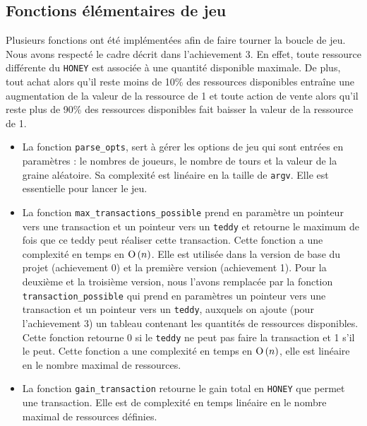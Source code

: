 \documentclass[12pt]{article}
\begin{document}
        \subsection{Fonctions élémentaires de jeu}
        Plusieurs fonctions ont été implémentées afin de faire tourner la boucle de jeu. Nous avons respecté le cadre décrit dans l'achievement 3. En effet, toute ressource différente du \texttt{HONEY} est associée à une quantité disponible maximale. De plus, tout achat alors qu'il reste moins de 10\% des ressources disponibles entraîne une augmentation de la valeur de la ressource de 1 et toute action de vente alors qu'il reste plus de 90\% des ressources disponibles fait baisser la valeur de la ressource de 1. \\
        \begin{itemize}
         \item La fonction \texttt{parse\_opts}, sert à gérer les options de jeu qui sont entrées en paramètres : le nombres de joueurs, le nombre de tours et la valeur de la graine aléatoire. Sa complexité est linéaire en la taille de \texttt{argv}. Elle est essentielle pour lancer le jeu.\\
         
        \item La fonction \texttt{max\_transactions\_possible} prend en paramètre un pointeur vers une transaction et un pointeur vers un \texttt{teddy} et retourne le maximum de fois que ce teddy peut réaliser cette transaction. Cette fonction a une complexité en temps en ${\text{O}}\left(n\right)$. Elle est utilisée dans la version de base du projet (achievement 0) et la première version (achievement 1). Pour la deuxième et la troisième version, nous l'avons remplacée par la fonction \texttt{transaction\_possible} qui prend en paramètres un pointeur vers une transaction et un pointeur vers un \texttt{teddy}, auxquels on ajoute (pour l'achievement 3) un tableau contenant les quantités de ressources disponibles. Cette fonction retourne 0 si le \texttt{teddy} ne peut pas faire la transaction et 1 s'il le peut. Cette fonction a une complexité en temps en ${\text{O}}\left(n\right)$, elle est linéaire en le nombre maximal de ressources.   \\
        
        \item La fonction \texttt{gain\_transaction} retourne le gain total en \texttt{HONEY} que permet une transaction. Elle est de complexité en temps linéaire en le nombre maximal de ressources définies.\\
        

\end{itemize}
\end{document}
